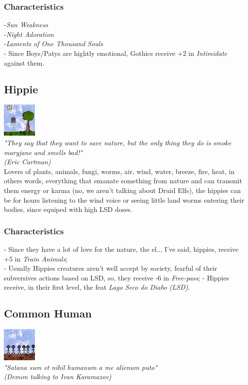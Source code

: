 \documentclass[ letterpaper,12pt]{article}
\begin{document}
\subsubsection{Characteristics}
-{\it Sun Weakness}\\
-{\it Night Adoration}\\
-{\it Laments of One Thousand Souls}\\
- Since Boys/Patys are hightly emotional, Gothics receive +2 in {\it Intimidate} against them.

\subsection{Hippie}
\includegraphics{../data/races/Img/hippie.png}\\
{\it "They say that they want to save nature, but the only thing they do is smoke maryjane and smells bad!"\\ (Eric Cartman)}\\

Lovers of plants, animals, fungi, worms, air, wind, water, breeze, fire, heat,
in others words, everything that emanate something from nature and can transmit
them energy or karma (no, we aren't talking about Druid Elfs), the hippies can
be for hours listening to the wind voice or seeing little land worms entering
their bodies, since equiped with high LSD doses.\\

\subsubsection{Characteristics}
- Since they have a lot of love for the nature, the el.., I've said, hippies, receive +5 in {\it Train Animals};\\
- Usually Hippies creatures aren't well accept by society, fearful of their subversives actions based on LSD, so, they receive -6 in {\it Free-pass};
- Hippies receive, in their first level, the feat {\it Lago Seco do Diabo (LSD)}.

\subsection{Common Human}
\includegraphics{../data/races/Img/humano.png}\\
{\it "Satana sum et nihil humanum a me alienum puto"\\
 (Demon talking to Ivan Karamazov)}\\
\end{document}
